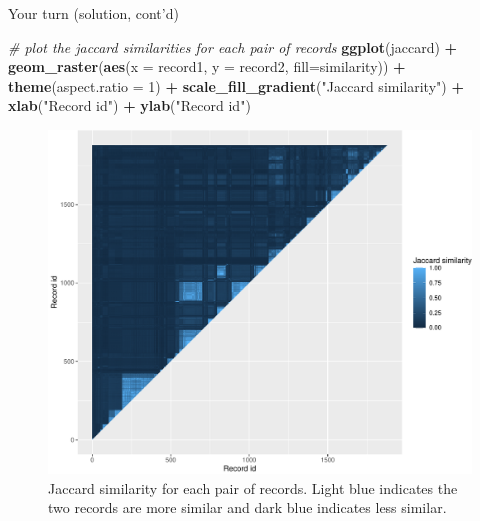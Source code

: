 \documentclass[
  ignorenonframetext,
]{beamer}
\newenvironment{Shaded}{\begin{snugshade}}{\end{snugshade}}
\newcommand{\CommentTok}[1]{\textcolor[rgb]{0.56,0.35,0.01}{\textit{#1}}}
\newcommand{\DataTypeTok}[1]{\textcolor[rgb]{0.13,0.29,0.53}{#1}}
\newcommand{\DecValTok}[1]{\textcolor[rgb]{0.00,0.00,0.81}{#1}}
\newcommand{\KeywordTok}[1]{\textcolor[rgb]{0.13,0.29,0.53}{\textbf{#1}}}
\newcommand{\NormalTok}[1]{#1}
\newcommand{\OperatorTok}[1]{\textcolor[rgb]{0.81,0.36,0.00}{\textbf{#1}}}
\newcommand{\StringTok}[1]{\textcolor[rgb]{0.31,0.60,0.02}{#1}}
\begin{document}
\begin{frame}[fragile]{Your turn (solution, cont'd)}
\protect\hypertarget{your-turn-solution-contd}{}

\begin{Shaded}
\begin{Highlighting}[]
\CommentTok{# plot the jaccard similarities for each pair of records}
\KeywordTok{ggplot}\NormalTok{(jaccard) }\OperatorTok{+}
\StringTok{  }\KeywordTok{geom_raster}\NormalTok{(}\KeywordTok{aes}\NormalTok{(}\DataTypeTok{x =}\NormalTok{ record1, }\DataTypeTok{y =}\NormalTok{ record2, }
                  \DataTypeTok{fill=}\NormalTok{similarity)) }\OperatorTok{+}
\StringTok{  }\KeywordTok{theme}\NormalTok{(}\DataTypeTok{aspect.ratio =} \DecValTok{1}\NormalTok{) }\OperatorTok{+}
\StringTok{  }\KeywordTok{scale_fill_gradient}\NormalTok{(}\StringTok{"Jaccard similarity"}\NormalTok{) }\OperatorTok{+}
\StringTok{  }\KeywordTok{xlab}\NormalTok{(}\StringTok{"Record id"}\NormalTok{) }\OperatorTok{+}\StringTok{ }\KeywordTok{ylab}\NormalTok{(}\StringTok{"Record id"}\NormalTok{)}
\end{Highlighting}
\end{Shaded}

\begin{figure}
\centering
\includegraphics{probabilistic-blocking-partI_files/figure-beamer/your-turn2-plot-1.pdf}
\caption{Jaccard similarity for each pair of records. Light blue
indicates the two records are more similar and dark blue indicates less
similar.}
\end{figure}

\end{frame}
\end{document}
